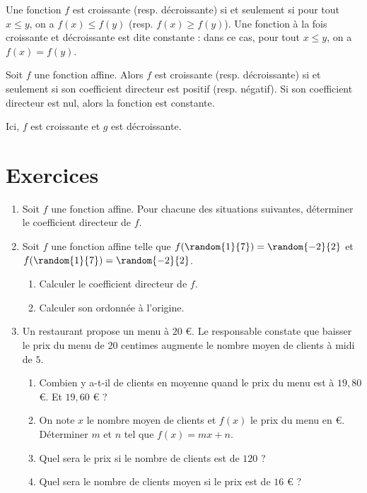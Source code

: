 \documentclass{article}
\begin{document}
\begin{definition}
Une fonction $f$ est croissante (resp. décroissante) si et seulement si pour tout $x \leq y$, on a $f(x) \leq f(y)$ (resp. $f(x) \geq f(y)$). Une fonction à la fois croissante et décroissante est dite constante : dans ce cas, pour tout $x \leq y$, on a $f(x) = f(y)$.
\end{definition}
\begin{proposition}
Soit $f$ une fonction affine. Alors $f$ est croissante (resp. décroissante) si et seulement si son coefficient directeur est positif (resp. négatif). Si son coefficient directeur est nul, alors la fonction est constante.
\end{proposition}
\begin{center}
\end{center}
Ici, $f$ est croissante et $g$ est décroissante.
\section{Exercices}
\begin{enumerate}[label=\textbf{ Exercice \arabic*}]
\item Soit $f$ une fonction affine. Pour chacune des situations suivantes, déterminer le coefficient directeur de $f$.
\begin{enumerate}[label=\emph{\alph*)}]
\end{enumerate}
\item Soit $f$ une fonction affine telle que $f(\random{1}{7}) = \random{-2}{2}$ et $f(\random{1}{7}) = \random{-2}{2}$.
\begin{enumerate}[label=\emph{\alph*)}]
\item Calculer le coefficient directeur de $f$.
\item Calculer son ordonnée à l'origine.
\end{enumerate}
\item Un restaurant propose un menu à $20$ \euro{}. Le responsable constate que baisser le prix du menu de $20$ centimes augmente le nombre moyen de clients à midi de $5$.
\begin{enumerate}[label=\emph{\alph*)}]
\item Combien y a-t-il de clients en moyenne quand le prix du menu est à $19,80$ \euro{}. Et $19,60$ \euro{} ?
\item On note $x$ le nombre moyen de clients et $f(x)$ le prix du menu en \euro{}. Déterminer $m$ et $n$ tel que $f(x) = mx + n$.
\item Quel sera le prix si le nombre de clients est de $120$ ?
\item Quel sera le nombre de clients moyen si le prix est de $16$ \euro{} ? 
\end{enumerate}
\end{enumerate}
\end{document}

